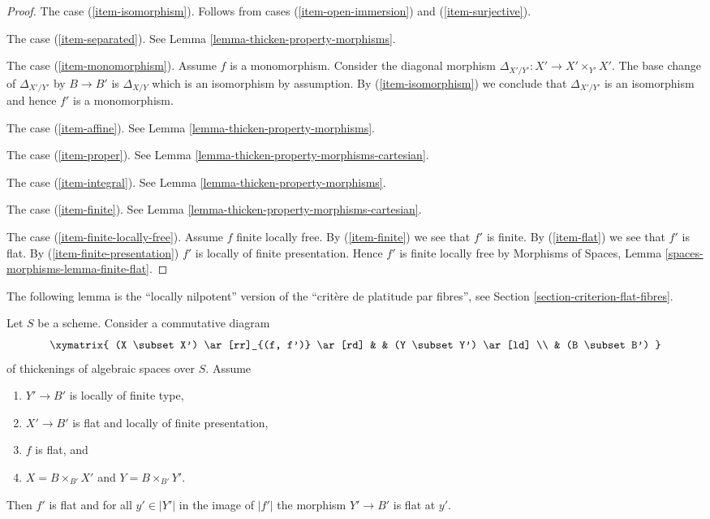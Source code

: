 \begin{proof}
\medskip\noindent
The case (\ref{item-isomorphism}). Follows from cases
(\ref{item-open-immersion}) and (\ref{item-surjective}).

\medskip\noindent
The case (\ref{item-separated}). See
Lemma \ref{lemma-thicken-property-morphisms}.

\medskip\noindent
The case (\ref{item-monomorphism}). Assume $f$ is a monomorphism.
Consider the diagonal morphism $\Delta_{X'/Y'} : X' \to X' \times_{Y'} X'$.
The base change of $\Delta_{X'/Y'}$ by $B \to B'$ is $\Delta_{X/Y}$
which is an isomorphism by assumption. By (\ref{item-isomorphism})
we conclude that $\Delta_{X'/Y'}$ is an isomorphism and hence
$f'$ is a monomorphism.

\medskip\noindent
The case (\ref{item-affine}). See Lemma \ref{lemma-thicken-property-morphisms}.

\medskip\noindent
The case (\ref{item-proper}). See
Lemma \ref{lemma-thicken-property-morphisms-cartesian}.

\medskip\noindent
The case (\ref{item-integral}). See
Lemma \ref{lemma-thicken-property-morphisms}.

\medskip\noindent
The case (\ref{item-finite}). See
Lemma \ref{lemma-thicken-property-morphisms-cartesian}.

\medskip\noindent
The case (\ref{item-finite-locally-free}). Assume $f$ finite locally free.
By (\ref{item-finite}) we see that $f'$ is finite.
By (\ref{item-flat}) we see that $f'$ is flat.
By (\ref{item-finite-presentation}) $f'$ is locally of finite
presentation. Hence $f'$ is finite locally free by
Morphisms of Spaces, Lemma \ref{spaces-morphisms-lemma-finite-flat}.
\end{proof}

\noindent
The following lemma is the ``locally nilpotent'' version of the
``crit\`ere de platitude par fibres'', see
Section \ref{section-criterion-flat-fibres}.

\begin{lemma}
\label{lemma-flatness-morphism-thickenings-fp-over-ft}
Let $S$ be a scheme. Consider a commutative diagram
$$
\xymatrix{
(X \subset X') \ar[rr]_{(f, f')} \ar[rd] & & (Y \subset Y') \ar[ld] \\
& (B \subset B')
}
$$
of thickenings of algebraic spaces over $S$. Assume
\begin{enumerate}
\item $Y' \to B'$ is locally of finite type,
\item $X' \to B'$ is flat and locally of finite presentation,
\item $f$ is flat, and
\item $X = B \times_{B'} X'$ and $Y = B \times_{B'} Y'$.
\end{enumerate}
Then $f'$ is flat and for all $y' \in |Y'|$ in the image of $|f'|$
the morphism $Y' \to B'$ is flat at $y'$.
\end{lemma}

